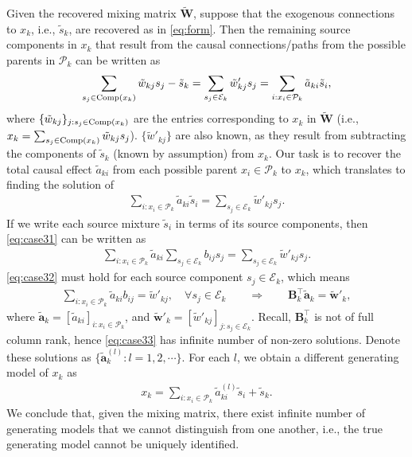 \documentclass[12pt]{article}
\newcommand{\bB}{\mathbf{B}}
\newcommand{\bW}{\mathbf{W}}
\begin{document}
Given the recovered mixing matrix $\tilde{\bW}$, suppose that the exogenous connections to $x_k$, i.e., $\tilde{s}_k$, are recovered as in \eqref{eq:form}. Then the remaining source components in $x_k$ that result from the causal connections/paths from the possible parents in $\mathcal{P}_k$ can be written as
\begin{align}\nonumber
\sum_{s_j\in {\rm{Comp}}(x_k)} \tilde{w}_{kj} s_j-\tilde{s}_k=\sum_{s_j\in \mathcal{E}_k} \tilde{w}'_{kj} s_j = \sum_{i: x_i\in \mathcal{P}_k}\tilde{a}_{k i} \tilde{s}_{i},
\end{align}
where $\{\tilde{w}_{kj}\}_{j:s_j\in {\rm{Comp}}(x_k)}$ are the entries corresponding to $x_k$ in $\tilde{\bW}$ (i.e., $x_k=\sum_{s_j\in {\rm{Comp}}(x_k)} \tilde{w}_{kj} s_j$). $\{\tilde{w}'_{kj}\}$ are also known, as they result from subtracting the components of $\tilde{s}_k$ (known by assumption) from $x_k$. Our task is to recover the total causal effect $\tilde{a}_{k i}$ from each possible parent $x_i\in \mathcal{P}_k$ to $x_k$, which translates to finding the solution of
\begin{align}
\sum_{i: x_i\in \mathcal{P}_k} \tilde{a}_{ki} \tilde{s}_{i} = \sum_{s_j\in \mathcal{E}_k} \tilde{w}'_{kj} s_j.
\label{eq:case31}
\end{align}
If we write each source mixture $\tilde{s}_i$ in terms of its source components, then \eqref{eq:case31} can be written as
\begin{align}
\sum_{i: x_i\in \mathcal{P}_k}\tilde{a}_{ki} \sum_{s_j\in \mathcal{E}_k} b_{ij} s_j = \sum_{ s_j\in \mathcal{E}_k} \tilde{w}'_{kj} s_j.
\label{eq:case32}
\end{align}
\eqref{eq:case32} must hold for each source component $s_j\in \mathcal{E}_k$, which means
\begin{align}
\sum_{i: x_i\in \mathcal{P}_k}\tilde{a}_{ki} b_{ij}  = \tilde{w}'_{kj},\quad \forall s_j\in \mathcal{E}_k \qquad 
\Longrightarrow \qquad \bB^{\top}_k \tilde{\mathbf{a}}_k = \tilde{\mathbf{w}}'_k,
\label{eq:case33}
\end{align}
where $\tilde{\mathbf{a}}_k = [\tilde{a}_{ki}]_{i:x_i\in\mathcal{P}_k}$, and $\tilde{\mathbf{w}}'_k = [\tilde{w}'_{kj}]_{j:s_j\in\mathcal{E}_k}$. Recall, $\bB^{\top}_k$ is not of full column rank, hence \eqref{eq:case33} has infinite number of non-zero solutions. Denote these solutions as $\{\tilde{\mathbf{a}}_k^{(l)}: l=1,2,\cdots\}$. For each $l$, we obtain a different generating model of $x_k$ as
\begin{align}
x_k = \sum_{i:x_i\in \mathcal{P}_k}  \tilde{a}_{ki}^{(l)} \tilde{s}_{i} + \tilde{s}_k.
\label{eq:case34}
\end{align}
We conclude that, given the mixing matrix, there exist infinite number of generating models that we cannot distinguish from one another, i.e., the true generating model cannot be uniquely identified.
\end{document}
